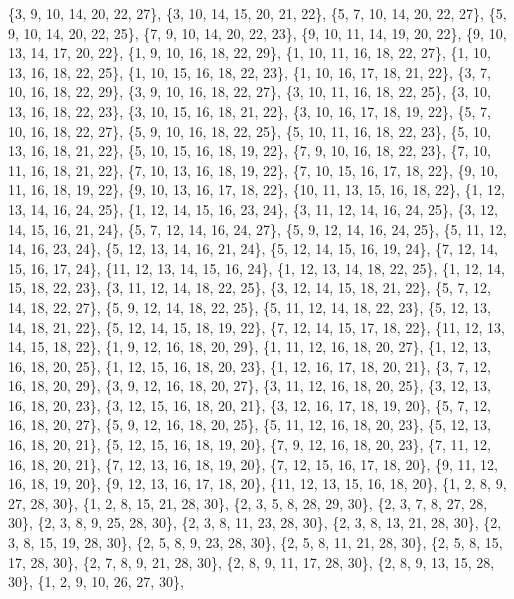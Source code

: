 \documentclass[11pt,a4paper]{article}
\begin{document}
{\{3, 9, 10, 14, 20, 22, 27\}, \{3, 10, 14, 15, 20, 21, 22\}, \{5, 7, 10, 14, 20, 22, 27\}, \{5, 9, 10, 14, 20, 22, 25\}, \{7, 9, 10, 14, 20, 22, 23\},
\{9, 10, 11, 14, 19, 20, 22\}, \{9, 10, 13, 14, 17, 20, 22\}, \{1, 9, 10, 16, 18, 22, 29\}, \{1, 10, 11, 16, 18, 22, 27\}, \{1, 10, 13, 16, 18, 22, 25\},
\{1, 10, 15, 16, 18, 22, 23\}, \{1, 10, 16, 17, 18, 21, 22\}, \{3, 7, 10, 16, 18, 22, 29\}, \{3, 9, 10, 16, 18, 22, 27\}, \{3, 10, 11, 16, 18, 22, 25\},
\{3, 10, 13, 16, 18, 22, 23\}, \{3, 10, 15, 16, 18, 21, 22\}, \{3, 10, 16, 17, 18, 19, 22\}, \{5, 7, 10, 16, 18, 22, 27\}, \{5, 9, 10, 16, 18, 22, 25\},
\{5, 10, 11, 16, 18, 22, 23\}, \{5, 10, 13, 16, 18, 21, 22\}, \{5, 10, 15, 16, 18, 19, 22\}, \{7, 9, 10, 16, 18, 22, 23\}, \{7, 10, 11, 16, 18, 21, 22\},
\{7, 10, 13, 16, 18, 19, 22\}, \{7, 10, 15, 16, 17, 18, 22\}, \{9, 10, 11, 16, 18, 19, 22\}, \{9, 10, 13, 16, 17, 18, 22\}, \{10, 11, 13, 15, 16, 18, 22\},
\{1, 12, 13, 14, 16, 24, 25\}, \{1, 12, 14, 15, 16, 23, 24\}, \{3, 11, 12, 14, 16, 24, 25\}, \{3, 12, 14, 15, 16, 21, 24\}, \{5, 7, 12, 14, 16, 24, 27\},
\{5, 9, 12, 14, 16, 24, 25\}, \{5, 11, 12, 14, 16, 23, 24\}, \{5, 12, 13, 14, 16, 21, 24\}, \{5, 12, 14, 15, 16, 19, 24\}, \{7, 12, 14, 15, 16, 17, 24\},
\{11, 12, 13, 14, 15, 16, 24\}, \{1, 12, 13, 14, 18, 22, 25\}, \{1, 12, 14, 15, 18, 22, 23\}, \{3, 11, 12, 14, 18, 22, 25\}, \{3, 12, 14, 15, 18, 21, 22\},
\{5, 7, 12, 14, 18, 22, 27\}, \{5, 9, 12, 14, 18, 22, 25\}, \{5, 11, 12, 14, 18, 22, 23\}, \{5, 12, 13, 14, 18, 21, 22\}, \{5, 12, 14, 15, 18, 19, 22\},
\{7, 12, 14, 15, 17, 18, 22\}, \{11, 12, 13, 14, 15, 18, 22\}, \{1, 9, 12, 16, 18, 20, 29\}, \{1, 11, 12, 16, 18, 20, 27\}, \{1, 12, 13, 16, 18, 20, 25\},
\{1, 12, 15, 16, 18, 20, 23\}, \{1, 12, 16, 17, 18, 20, 21\}, \{3, 7, 12, 16, 18, 20, 29\}, \{3, 9, 12, 16, 18, 20, 27\}, \{3, 11, 12, 16, 18, 20, 25\},
\{3, 12, 13, 16, 18, 20, 23\}, \{3, 12, 15, 16, 18, 20, 21\}, \{3, 12, 16, 17, 18, 19, 20\}, \{5, 7, 12, 16, 18, 20, 27\}, \{5, 9, 12, 16, 18, 20, 25\},
\{5, 11, 12, 16, 18, 20, 23\}, \{5, 12, 13, 16, 18, 20, 21\}, \{5, 12, 15, 16, 18, 19, 20\}, \{7, 9, 12, 16, 18, 20, 23\}, \{7, 11, 12, 16, 18, 20, 21\},
\{7, 12, 13, 16, 18, 19, 20\}, \{7, 12, 15, 16, 17, 18, 20\}, \{9, 11, 12, 16, 18, 19, 20\}, \{9, 12, 13, 16, 17, 18, 20\}, \{11, 12, 13, 15, 16, 18, 20\},
\{1, 2, 8, 9, 27, 28, 30\}, \{1, 2, 8, 15, 21, 28, 30\}, \{2, 3, 5, 8, 28, 29, 30\}, \{2, 3, 7, 8, 27, 28, 30\}, \{2, 3, 8, 9, 25, 28, 30\},
\{2, 3, 8, 11, 23, 28, 30\}, \{2, 3, 8, 13, 21, 28, 30\}, \{2, 3, 8, 15, 19, 28, 30\}, \{2, 5, 8, 9, 23, 28, 30\}, \{2, 5, 8, 11, 21, 28, 30\},
\{2, 5, 8, 15, 17, 28, 30\}, \{2, 7, 8, 9, 21, 28, 30\}, \{2, 8, 9, 11, 17, 28, 30\}, \{2, 8, 9, 13, 15, 28, 30\}, \{1, 2, 9, 10, 26, 27, 30\},
}
\end{document}
